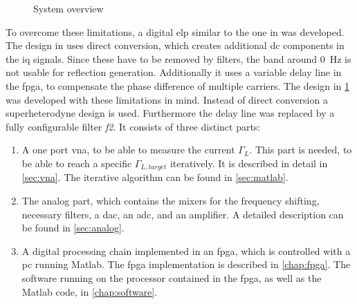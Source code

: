 \documentclass[12pt,a4paper,parskip=full,abstract=true,BCOR=10mm,twoside,open=right]{scrreprt}
\begin{document}
\begin{figure}[htb]
{
    }
    \caption{System overview}
    \label{fig:overall_hf}
\end{figure}

To overcome these limitations, a digital \gls{elp} similar to the one in
\cite{hashim_active_2008} was developed. The design in \cite{hashim_active_2008}
uses direct conversion, which creates additional \gls{dc} components in the \gls{iq}
signals. Since these have to be removed by filters, the band around \SI{0}{\hertz} is
not usable for reflection generation. Additionally it uses a variable delay line in
the \gls{fpga}, to compensate the phase difference of multiple carriers. The design in
\cref{fig:overall_hf} was developed with these limitations in mind. Instead of direct
conversion a superheterodyne design is used. Furthermore the delay line was replaced by
a fully configurable filter \textit{f2}. It consists of three distinct parts:

\begin{enumerate}
    \item A one port \gls{vna}, to be able to measure the current $\Gamma_L$. This part is
needed, to be able to reach a specific $\Gamma_{L,target}$ iteratively. It is
described in detail in \cref{sec:vna}. The iterative algorithm can be found
in \cref{sec:matlab}.
    \item The analog part, which contains the mixers for the frequency shifting, necessary
        filters, a \gls{dac}, an \gls{adc}, and an amplifier. A detailed description can be found
        in \cref{sec:analog}.
    \item A digital processing chain implemented in an \gls{fpga}, which is controlled with
a \gls{pc} running Matlab. The \gls{fpga} implementation is described in \cref{chap:fpga}.
The software running on the processor contained in the \gls{fpga}, as well as the Matlab
code, in \cref{chap:software}.
\end{enumerate}
\end{document}
